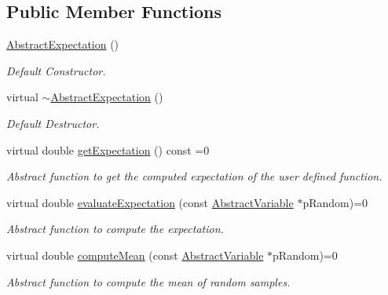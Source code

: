 \subsection*{Public Member Functions}
\begin{DoxyCompactItemize}
\item 
\mbox{\label{classAbstractExpectation_ac2de8ff119a142ae9e6baf2bc28ee2a5}} 
\hyperlink{classAbstractExpectation_ac2de8ff119a142ae9e6baf2bc28ee2a5}{Abstract\+Expectation} ()
\begin{DoxyCompactList}\small\item\em Default Constructor. \end{DoxyCompactList}\item 
\mbox{\label{classAbstractExpectation_af1eab325a354bc1444dd80fe572cf8a0}} 
virtual \hyperlink{classAbstractExpectation_af1eab325a354bc1444dd80fe572cf8a0}{$\sim$\+Abstract\+Expectation} ()
\begin{DoxyCompactList}\small\item\em Default Destructor. \end{DoxyCompactList}\item 
virtual double \hyperlink{classAbstractExpectation_a256d47c871d941e081a17194dda4d774}{get\+Expectation} () const =0
\begin{DoxyCompactList}\small\item\em Abstract function to get the computed expectation of the user defined function. \end{DoxyCompactList}\item 
virtual double \hyperlink{classAbstractExpectation_a3f3bc9fdcbd4856212857fc0fa4445a5}{evaluate\+Expectation} (const \hyperlink{classAbstractVariable}{Abstract\+Variable} $\ast$p\+Random)=0
\begin{DoxyCompactList}\small\item\em Abstract function to compute the expectation. \end{DoxyCompactList}\item 
virtual double \hyperlink{classAbstractExpectation_ac0fd8ea2ea546f6d01adec641886db14}{compute\+Mean} (const \hyperlink{classAbstractVariable}{Abstract\+Variable} $\ast$p\+Random)=0
\begin{DoxyCompactList}\small\item\em Abstract function to compute the mean of random samples. \end{DoxyCompactList}\end{DoxyCompactItemize}



